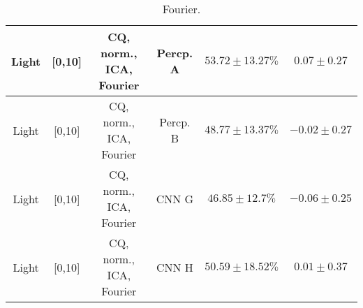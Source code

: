 \begin{table}[!htb]
{\begin{tabular}{c|c|c|c|c|c}
    \hline
    Light               & [0,10]                                        & CQ, norm., ICA, Fourier   & Percp. A              &  $53.72 \pm 13.27\%$  & $0.07 \pm 0.27$\\  
    \hline
    Light               & [0,10]                                        & CQ, norm., ICA, Fourier   & Percp. B              &  $48.77 \pm 13.37\%$  & $-0.02 \pm 0.27$\\ 
    \hline
    Light               & [0,10]                                        & CQ, norm., ICA, Fourier   & CNN G                 &  $46.85 \pm 12.7\%$   & $-0.06 \pm 0.25$\\  
    \hline
    Light               & [0,10]                                        & CQ, norm., ICA, Fourier   & CNN H                 &  $50.59 \pm 18.52\%$  & $0.01 \pm 0.37$\\  
    \hline
\end{tabular}
}
\caption{Fourier.}
\label{tab:light-fourier-app}
\end{table}
